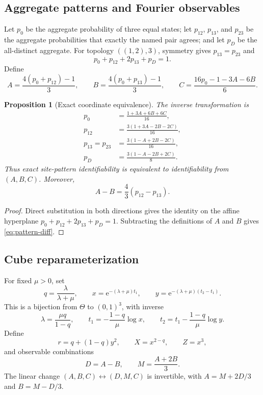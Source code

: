 \documentclass[11pt]{article}
\newtheorem{proposition}[theorem]{Proposition}
\newcommand{\Thetao}{\Theta}
\newcommand{\e}{\mathrm e}
\begin{document}
\subsection{Aggregate patterns and Fourier observables}
Let $p_0$ be the aggregate probability of three equal states; let $p_{12}$, $p_{13}$, and $p_{23}$ be the aggregate probabilities that exactly the named pair agrees; and let $p_D$ be the all-distinct aggregate.  For topology $((1,2),3)$, symmetry gives $p_{13}=p_{23}$ and
\[
p_0+p_{12}+2p_{13}+p_D=1.
\]
Define
\[
A=\frac{4(p_0+p_{12})-1}{3},\qquad
B=\frac{4(p_0+p_{13})-1}{3},\qquad
C=\frac{16p_0-1-3A-6B}{6}.
\]

\begin{proposition}[Exact coordinate equivalence]\label{prop:site-fourier}
The inverse transformation is
\begin{align*}
p_0&=\frac{1+3A+6B+6C}{16},\\
p_{12}&=\frac{3(1+3A-2B-2C)}{16},\\
p_{13}=p_{23}&=\frac{3(1-A+2B-2C)}{16},\\
p_D&=\frac{3(1-A-2B+2C)}8.
\end{align*}
Thus exact site-pattern identifiability is equivalent to identifiability from $(A,B,C)$.  Moreover,
\begin{equation}\label{eq:pattern-diff}
A-B=\frac43(p_{12}-p_{13}).
\end{equation}
\end{proposition}
\begin{proof}
Direct substitution in both directions gives the identity on the affine hyperplane $p_0+p_{12}+2p_{13}+p_D=1$.  Subtracting the definitions of $A$ and $B$ gives \eqref{eq:pattern-diff}.
\end{proof}

\subsection{Cube reparameterization}
For fixed $\mu>0$, set
\begin{equation}\label{eq:cube}
q=\frac{\lambda}{\lambda+\mu},\qquad
x=\e^{-(\lambda+\mu)t_1},\qquad
y=\e^{-(\lambda+\mu)(t_2-t_1)}.
\end{equation}
This is a bijection from $\Thetao$ to $(0,1)^3$, with inverse
\begin{equation}\label{eq:cube-inverse}
\lambda=\frac{\mu q}{1-q},\qquad
t_1=-\frac{1-q}{\mu}\log x,\qquad
t_2=t_1-\frac{1-q}{\mu}\log y.
\end{equation}
Define
\[
r=q+(1-q)y^2,\qquad X=x^{2-q},\qquad Z=x^3,
\]
and observable combinations
\[
D=A-B,\qquad M=\frac{A+2B}{3}.
\]
The linear change $(A,B,C)\leftrightarrow(D,M,C)$ is invertible, with
$A=M+2D/3$ and $B=M-D/3$.
\end{document}
